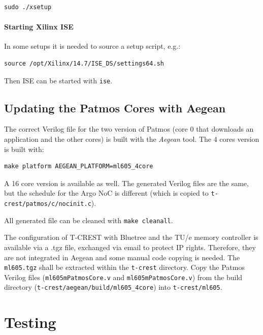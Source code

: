 \documentclass[a4paper,fontsize=10pt,twoside,DIV15,BCOR12mm,headinclude=true,footinclude=false,pagesize,bibtotoc]{scrbook}
\newcommand{\code}[1]{{\texttt{#1}}}
\begin{document}
\begin{verbatim}
sudo ./xsetup
\end{verbatim}

\paragraph{Starting Xilinx ISE}

In some setups it is needed to source a setup script, e.g.:

\begin{verbatim}
source /opt/Xilinx/14.7/ISE_DS/settings64.sh
\end{verbatim}

Then ISE can be started with \code{ise}.

\subsection{Updating the Patmos Cores with Aegean}

The correct Verilog file for the two version of Patmos (core 0 that downloads an application and the other cores)
is built with the \emph{Aegean} tool. The 4 cores version is built with:

\begin{verbatim}
make platform AEGEAN_PLATFORM=ml605_4core
\end{verbatim}


A 16 core version is available as well. The generated Verilog files are the same,
but the schedule for the Argo NoC is different (which is copied to
\code{t-crest/patmos/c/nocinit.c}).

All generated file can be cleaned with \code{make cleanall}.

The configuration of T-CREST with Bluetree and the TU/e memory controller
is available via a .tgz file, exchanged via email to protect IP rights.
Therefore, they are not integrated in Aegean and some manual code copying is needed.
The \code{ml605.tgz} shall be extracted within the \code{t-crest} directory.
Copy the Patmos Verilog files (\code{ml605mPatmosCore.v} and \code{ml605mPatmosCore.v})
from the build directory (\code{t-crest/aegean/build/ml605\_4core}) into \code{t-crest/ml605}.

\section{Testing}
\end{document}
